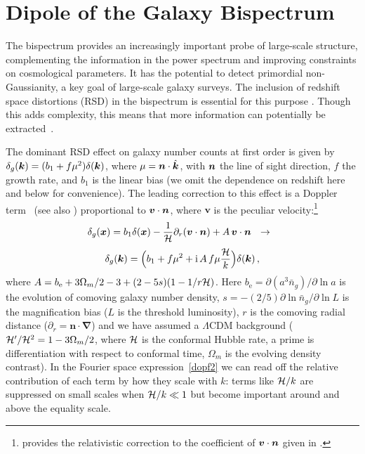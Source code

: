 \chapter{Dipole of the Galaxy Bispectrum}
\label{chapter:dipole}

The bispectrum provides an increasingly important probe of large-scale structure, complementing the information in the power spectrum and improving constraints on cosmological parameters. It has the potential to detect primordial non-Gaussianity, a key goal of large-scale galaxy surveys. The inclusion of redshift space distortions (RSD) in the bispectrum is essential for this purpose
\citep{Verde:1998zr,Scoccimarro:1999ed}. Though this adds complexity, this means that more information can potentially be extracted~\citep{Tellarini:2016sgp}.

The dominant RSD effect on galaxy number counts at first order is given by $\delta_g(\bm {k}) = (b_{1} + f\mu^{2})\delta(\bm {k})$, where $\mu=\bm {n}\cdot\hat{\bm {k}}$, with $\bm {n}$ the line of sight direction, $f$ the growth rate, and $b_1$ is the linear bias (we omit the dependence on redshift here and below for convenience). The leading correction to this effect is a Doppler term~\citep{Kaiser:1987qv,McDonald:2009dh,Challinor:2011bk} (see also \citet{Raccanelli:2016avd,Hall:2016bmm,Abramo:2017xnp})
proportional to $\bm{v}\cdot\bm {n}$, where $\bm{v}$ is the peculiar velocity:\footnote{\citet{Challinor:2011bk} provides the relativistic correction to the coefficient of  $\bm{v}\cdot\bm {n}$ given in \citet{Kaiser:1987qv,McDonald:2009dh}.}
\begin{equation} \label{dopf}
\delta_g(\bm {x}) = b_{1} \delta(\bm {x})-{1\over\mathcal{H}}\partial_r(\bm{v}\cdot\bm {n}) +{A}\,\bm{v}\cdot\bm {n} ~~\to~~
\end{equation}
\begin{equation} \delta_g(\bm {k})=\Big(b_1+f\mu^2+\mathrm{i\,} {A}\,f \mu{\mathcal{H}\over k}\Big)\delta(\bm {k})\,,\label{dopf2}
\end{equation}
where  ${A} = {b_{\textrm{e}}+{3}\Omega_m/2 -3 + (2-5s) (1-{1/ r\mathcal{H}} )}$.
Here  $b_{\textrm{e}}=\partial (a^3 \bar{n}_g)/\partial \ln a$ is the evolution of comoving galaxy number density, $s=-(2/5)\partial \ln \bar{n}_g/\partial \ln L$ is the magnification bias ($L$ is the threshold luminosity), $r$ is the comoving radial distance ($\partial_r=\bm n\cdot\bm\nabla$) and we have assumed a $\Lambda$CDM background
($\mathcal{H}'/\mathcal{H}^2=1-3\Omega_m/2$, where $\mathcal{H}$ is the conformal Hubble rate, a prime is differentiation with respect to conformal time, $\Omega_m$ is the evolving density contrast). In the  Fourier space expression~\eqref{dopf2} we can read off the relative contribution of each term by how they scale with $k$: terms like $\mathcal{H}/k$ are suppressed on small scales when $\mathcal{H}/k\ll1$ but become important around and above the equality scale. 



